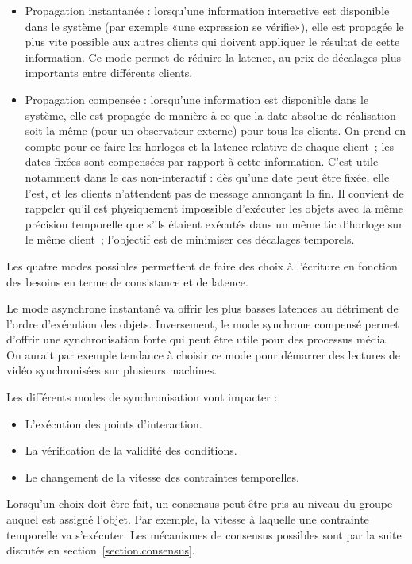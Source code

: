 \documentclass[10pt]{article}
\newcommand\triggers{points d'interaction\xspace}
\begin{document}
\begin{itemize}
	\item Propagation instantanée : lorsqu'une information interactive est disponible dans le système (par exemple «une expression se vérifie»), elle est propagée le plus vite possible aux autres clients qui doivent appliquer le résultat de cette information. 
    Ce mode permet de réduire la latence, au prix de décalages plus importants entre différents clients.
	\item Propagation compensée : lorsqu'une information est disponible dans le système, elle est propagée de manière à ce que la date absolue de réalisation soit la même (pour un observateur externe) pour tous les clients. 
	On prend en compte pour ce faire les horloges et la latence relative de chaque client~; les dates fixées sont compensées par rapport à cette information.
	C'est utile notamment dans le cas non-interactif : dès qu'une date peut être fixée, elle l'est, et les clients n'attendent pas de message annonçant la fin. 
	Il convient de rappeler qu'il est physiquement impossible d'exécuter les objets avec la même précision temporelle que s'ils étaient exécutés dans un même tic d'horloge sur le même client~; l'objectif est de minimiser ces décalages temporels.
\end{itemize}

Les quatre modes possibles permettent de faire des choix à l'écriture en fonction des besoins en terme de consistance et de latence.

Le mode asynchrone instantané va offrir les plus basses latences au détriment de l'ordre d'exécution des objets.
Inversement, le mode synchrone compensé permet d'offrir une synchronisation forte qui peut être utile pour des processus média. 
On aurait par exemple tendance à choisir ce mode pour démarrer des lectures de vidéo synchronisées sur plusieurs machines.

Les différents modes de synchronisation vont impacter : 
\begin{itemize}
    \item L'exécution des \triggers.
    \item La vérification de la validité des conditions.
    \item Le changement de la vitesse des contraintes temporelles.
\end{itemize}

Lorsqu'un choix doit être fait, un consensus peut être pris au niveau du groupe auquel est assigné l'objet. 
Par exemple, la vitesse à laquelle une contrainte temporelle va s'exécuter.
Les mécanismes de consensus possibles sont par la suite discutés en section~\ref{section.consensus}.
\end{document}
